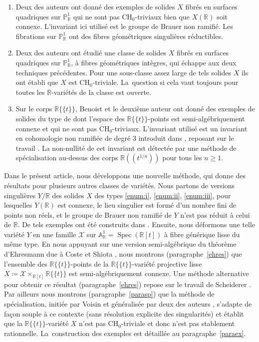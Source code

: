 \documentclass[JEP,XML,SOM,Unicode,francais,published]{cedram}
\newcommand{\CH}{\mathrm{CH}}
\theoremstyle{definition}
\newcommand{\R}{\mathbb R}
\newcommand{\A}{\mathbb A}
\renewcommand{\P}{\mathbb P}
\newcommand{\Spec}{\operatorname{Spec}}
\newcommand{\mc}[1]{\mathcal{#1}}
\newcommand{\puiseux}{\mathbb{R}\{\!\{t\}\!\}}
\begin{document}
\begin{enumerate}
\item Deux des auteurs \cite{colliot2024certaines} ont donné des exemples de solides $X$ fibrés en surfaces quadriques sur $\P^1_{\R}$
qui ne sont pas $\CH_{0}$-triviaux bien que $X(\R)$
soit connexe. L'invariant ici utilisé est le groupe de Brauer non ramifié.
Les fibrations sur $\P^1_{\R}$ ont des fibres géométriques singulières réductibles.
\item Deux des auteurs \cite{colliot2024certaines} ont étudié une classe de
solides $X$ fibrés en surfaces quadriques sur $\P^1_{\R}$, à fibres géométriques intègres, qui échappe aux deux techniques précédentes. Pour une sous-classe assez large de tels solides $X$ ils ont établi
que $X$ est $\CH_{0}$-triviale. La~question si cela vaut toujours pour toutes les $\R$-variétés de la classe est ouverte.
\item Sur le corps $\puiseux$, Benoist et le deuxième auteur \cite{benoist2026rationality} ont donné
des exemples de solides du type de \cite{colliot2024certaines}
dont l'espace des $\puiseux$-points est semi-algébriquement connexe et
qui ne sont pas $\CH_{0}$-triviaux. L'invariant utilisé
est un invariant en cohomologie non ramifiée de degré $3$ introduit dans \cite{colliot2024certaines}, reposant sur le travail \cite{colliot1993groupe}.
La non-nullité de cet invariant est détectée par
une méthode de spécialisation au-dessus des corps
$\R(\!(t^{1/n})\!)$ pour tous les $n\geq 1$.
\end{enumerate}

Dans le présent article, nous développons une nouvelle méthode, qui
donne des résultats pour plusieurs autres classes de variétés. Nous partons de versions singulières $Y/\R$ des solides $X$ des types \eqref{enum:i}, \eqref{enum:ii}, \eqref{enum:iii}, pour lesquelles
$Y(\R)$ est connexe, le lieu singulier est formé d'un nombre fini de points non réels,
et le groupe de Brauer non ramifié de $Y$ n'est pas réduit à celui de $\R$. De tels exemples ont été construits dans \cite{colliot2024certaines}.
Ensuite, nous déformons une telle variété $Y$ en une famille $\mc{X}$ sur $\A^1_\R=\Spec (\R[t])$ à fibre générique lisse du même type. En nous appuyant sur une version semi-algébrique du théorème d'Ehresmann due à Coste et Shiota \cite{coste1992nash}, nous montrons (paragraphe~\ref{ehres}) que l'ensemble des $\puiseux$-points de la $\puiseux$-variété projective lisse $X\coloneqq \mc{X}\times_{\R[t]}\puiseux$ est semi-algébriquement connexe. Une méthode alternative pour obtenir ce résultat (paragraphe~\ref{ehres}) repose sur le travail de Scheiderer \cite{scheiderer1994real}.
Par ailleurs nous montrons (paragraphe~\ref{parasp}) que la méthode de spécialisation, initiée par Voisin et généralisée par deux des auteurs \cite{colliot2016hypersurfaces}, s'adapte de façon souple à ce contexte
(sans résolution explicite des singularités)
et établit que la $\puiseux$-variété $X$ n'est pas
$\CH_0$-triviale et donc n'est pas stablement rationnelle. La~construction des exemples est détaillée au paragraphe~\ref{paraex}.
\end{document}

